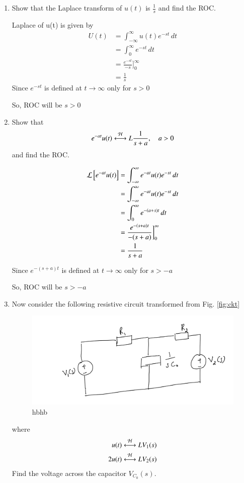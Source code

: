 \documentclass[journal,12pt,twocolumn]{IEEEtran}
\renewcommand\thesection{\arabic{section}}
\begin{document}
\begin{enumerate}[label=\arabic*.,ref=\thesection.\theenumi]
	\item Show that the Laplace transform of $u(t)$ is $\frac{1}{s}$ and find the ROC.

		\solution Laplace of u(t) is given by
		\begin{align}
			U(t)&=\int_{-\infty}^{\infty} u(t) e^{-st}\, dt\\
			&=\int_{0}^{\infty} e^{-st}\, dt\\
			&=\frac{e^{-st}}{-s}\bigg]_0^\infty\\
			&=\frac{1}{s}
		\end{align}
Since $e^{-st}$ is defined at $t\to \infty$ only for $s>0$

So, ROC will be $s>0$
	\item Show that 
		\begin{align}
			e^{-at}u(t) \overset{\mathcal{H}}{ \longleftrightarrow}{L} \frac{1}{s+a}, \quad a > 0
		\end{align}
		and find the ROC.

		\solution
		\begin{align}
			\mathcal{L}{}\left[e^{-at}u(t)\right]&=\int_{-\infty}^{\infty} e^{-at}u(t) e^{-st}\, dt\\
			&=\int_{-\infty}^{\infty} e^{-at}u(t) e^{-st}\, dt\\
			&=\int_{0}^{\infty} e^{-(a+s)t} \, dt\\
			&=\frac{e^{-(s+a)t}}{-(s+a)}\bigg]_0^\infty\\
			&=\frac{1}{s+a}
		\end{align}

		Since $e^{-(s+a)t}$ is defined at $t\to \infty$ only for $s>-a$

		So, ROC will be $s>-a$

	\item Now consider the following resistive circuit transformed from 
			Fig. \ref{fig:ckt}
		\begin{figure}[!ht]
			\centering
			\includegraphics[width=\columnwidth]{figs/lap-ckt.jpg}
			\caption{hbhb}
			\label{fig:lap-ckt}
\end{figure}
		where 
		\begin{align}
			u(t) \overset{\mathcal{H}}{ \longleftrightarrow}{L} V_1(s)
			\\
			2u(t) \overset{\mathcal{H}}{ \longleftrightarrow}{L} V_2(s)
		\end{align}
		Find the voltage across the capacitor $V_{C_0}(s)$.
		

\end{enumerate}
\end{document}
